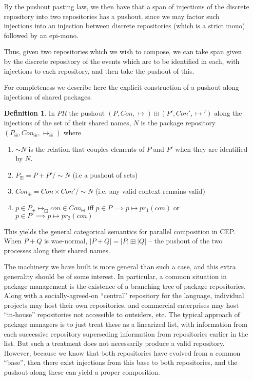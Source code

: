\documentclass[hoptionsi,review,screen,format=sigconf]{acmart}
\theoremstyle{definition}
\newtheorem{definition}{Definition}[section]
\newcommand{\PRb}{\mathit{PR}}
\begin{document}

By the pushout pasting law, we then have that a span of injections of the discrete repository into two repositories has a pushout, since we may factor such injections into an injection between discrete repositories (which is a strict mono) followed by an epi-mono.

Thus, given two repositories which we wish to compose, we can take span given by the discrete repository of the events which are to be identified in each, with injections to each repository, and then take the pushout of this.

For completeness we describe here the explicit construction of a pushout along injections of shared packages.

\begin{definition}
In \(\PRb\) the pushout \((P, Con, \mapsto) \boxplus (P',Con', \mapsto ')\) along the injections of the set of their shared names, \(N\) is the package repository \((P_{\boxplus},Con_{\boxplus},\mapsto_{\boxplus})\) where

  \begin{enumerate}
   \item \(\sim{N}\) is the relation that couples elements of \(P\) and \(P'\) when they are identified by \(N\).
   \item \(P_{\boxplus} = P+P'/\sim{N}\) (i.e a pushout of sets)
   \item \(Con_{\boxplus} = Con \times Con' / \sim{N}\) (i.e. any valid context remains valid)
   \item \(p \in P_{\boxplus} \mapsto_{\boxplus} con \in Con_{\boxplus}\) iff \(p \in P \implies p \mapsto pr_1(con)\) or \(p \in P' \implies p \mapsto pr_2(con)\)
  \end{enumerate}
\end{definition}


This yields the general categorical semantics for parallel composition in CEP. When \(P + Q\) is wae-normal, \(|P + Q| = |P| \boxplus |Q|\) -- the pushout of the two processes along their shared names.


The machinery we have built is more general than such a case, and this extra generality should be of some interest. In particular, a common situation in package management is the existence of a branching tree of package repositories. Along with a socially-agreed-on ``central'' repository for the language, individual projects may host their own repositories, and commercial enterprises may host ``in-house'' repositories not accessible to outsiders, etc. The typical approach of package managers is to just treat these as a linearized list, with information from each successive repository superseding information from repositories earlier in the list. But such a treatment does not necessarily produce a valid repository. However, because we know that both repositories have evolved from a common ``base'', then there exist injections from this base to both repositories, and the pushout along these can yield a proper composition.
\end{document}
